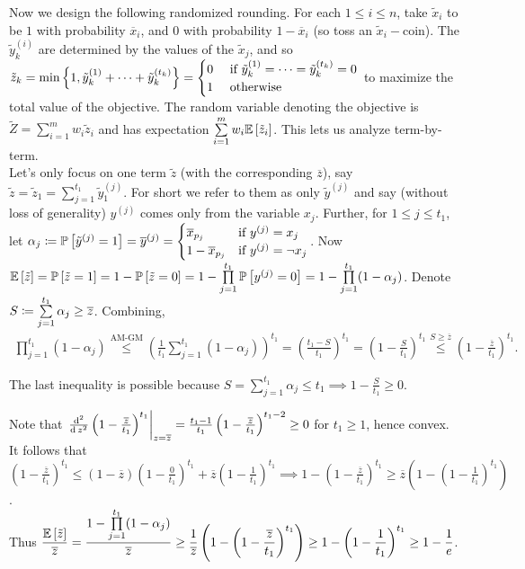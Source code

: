 \begin{enumerate}[label=(\alph*)]
Now we design the following randomized rounding.  For each $1\le i\le n$, take $\tilde x_{i}$ to be $1$ with probability $\overline x_{i}$, and $0$ with probability $1-\overline x_{i}$ (so toss an $\tilde x_{i}-$coin). The $\tilde y_{k}^{(i)}$ are determined by the values of the $\tilde x_{j}$, and so $\tilde z_{k} = \min \left\{1, \tilde y_{k}^{(1)} + \cdots + \tilde y_{k}^{(t_{k})}\right\} = \begin{cases}
0 & \text{ if } \tilde y_{k}^{(1)} = \cdots = \tilde y_{k}^{(t_{k})}=0\\
1 & \text{ otherwise}
\end{cases}$ to maximize the total value of the objective. The random variable denoting the objective is $\tilde Z = \sum\limits_{i=1}^{m}w_{i}\tilde z_{i}$ and has expectation $\sum\limits_{i=1}^{m}w_{i}\mathbb E\left[ \tilde z_{i} \right]$. This lets us analyze term-by-term.\\
Let's only focus on one term $\tilde z$ (with the corresponding $\overline z$), say $\tilde z = \tilde z_{1} = \sum\limits_{j=1}^{t_{1}}\tilde y_{1}^{(j)}$. For short we refer to them as only $\tilde y^{(j)}$ and say (without loss of generality) $y^{(j)}$ comes only from the variable $x_{j}$. Further, for $1\le j\le t_{1}$, let $\alpha_{j} \coloneqq \mathbb P\left[ \tilde y^{(j)} = 1 \right] = \overline{y}^{(j)} = \begin{cases} \overline x_{p_{j}} & \text{if } y^{(j)} = x_{j}\\
1-\overline{x}_{p_{j}} & \text{if } y^{(j)} = \neg x_{j}
\end{cases}$. Now $\mathbb E\left[ \tilde z \right] = \mathbb P\left[ \tilde z=1 \right] = 1-\mathbb P\left[ \tilde z=0 \right] = 1-\prod\limits_{j=1}^{t_{1}}\mathbb P\left[ y^{(j)}=0 \right] = 1-\prod\limits_{j=1}^{t_{1}}(1-\alpha_{j})$. Denote $S\coloneqq \sum\limits_{j=1}^{t_{1}}\alpha_{j} \ge \overline z$. Combining,
\begin{align*}
\prod_{j=1}^{t_{1}}(1-\alpha_{j}) \stackrel{\text{AM-GM}}{\le} \left(\frac{1}{t_{1}}\sum\limits_{j=1}^{t_{1}}(1-\alpha_{j})\right)^{t_{1}}
= \left(\frac{t_{1}-S}{t_{1}}\right)^{t_{1}} 
= \left(1-\frac{S}{t_{1}}\right)^{t_{1}} \stackrel{S\ge \overline z}{\le} \left(1-\frac{\overline{z}}{t_{1}}\right)^{t_{1}} %
.
\end{align*}

The last inequality is possible because $S=\sum_{j=1}^{t_{1}} \alpha_{j} \le t_{1}\implies 1-\frac{S}{t_{1}} \ge 0$.

Note that $\left.\frac{\operatorname{d}^{2}}{\operatorname{d} z^{2}}\left(1-\frac{\overline{z}}{t_{1}}\right)^{t_{1}}\right|_{z=\overline z} = \frac{t_{1}-1}{t_{1}} \left(1-\frac{\overline{z}}{t_{1}}\right)^{t_{1}-2} \ge 0$ for $t_{1}\ge 1$, hence convex. It follows that $\left(1-\frac{\overline{z}}{t_{1}}\right)^{t_{1}} \le (1-\overline{z})\left(1-\frac{0}{t_{1}}\right)^{t_{1}} + \overline{z} \left(1-\frac{1}{t_{1}}\right)^{t_{1}} \implies 1-\left(1-\frac{\overline{z}}{t_{1}}\right)^{t_{1}} \ge \overline z \left(1-\left(1-\frac{1}{t_{1}}\right)^{t_{1}}\right)$.\\
Thus $\displaystyle\frac{\mathbb E\left[ \tilde z \right]}{\overline z} = \frac{1-\prod\limits_{j=1}^{t_{1}}(1-\alpha_{j})}{\overline z} \ge \frac{1}{\overline{z}}\left(1-\left(1-\frac{\overline z}{t_{1}}\right)^{t_{1}}\right) \ge 1- \left(1-\frac{1}{t_{1}}\right)^{t_{1}} \ge 1-\frac{1}{e}$.


\end{enumerate}
